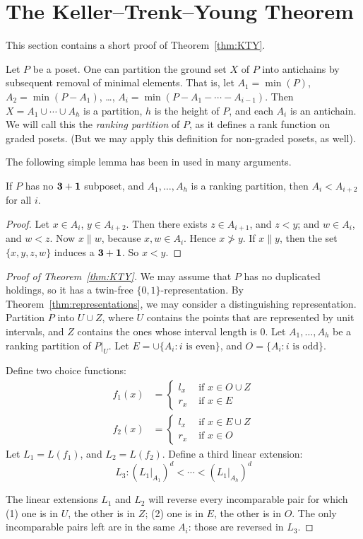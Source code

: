 \section{The Keller--Trenk--Young Theorem}

This section contains a short proof of Theorem~\ref{thm:KTY}.

Let $P$ be a poset. One can partition the ground set $X$ of $P$ into antichains by subsequent removal of minimal elements. That is, let $A_1=\min(P)$, $A_2=\min(P-A_1)$, \dots, $A_i=\min(P-A_1-\cdots-A_{i-1})$. Then $X=A_1\cup\cdots\cup A_h$ is a partition, $h$ is the height of $P$, and each $A_i$ is an antichain. We will call this the \emph{ranking partition} of $P$, as it defines a rank function on graded posets. (But we may apply this definition for non-graded posets, as well).

The following simple lemma has been in used in many arguments.

\begin{lemma}\label{lem:ranking}
If $P$ has no $\mathbf{3}+\mathbf{1}$ subposet, and $A_1,\ldots,A_h$ is a ranking partition, then $A_i<A_{i+2}$ for all $i$.
\end{lemma}

\begin{proof}
Let $x\in A_i$, $y\in A_{i+2}$. Then there exists $z\in A_{i+1}$, and $z<y$; and $w\in A_i$, and $w<z$. Now $x\| w$, because $x,w\in A_i$. Hence $x\not> y$. If $x\|y$, then the set $\{x,y,z,w\}$ induces a $\mathbf{3}+\mathbf{1}$. So $x<y$.
\end{proof}

\begin{proof}[Proof of Theorem~\ref{thm:KTY}]
We may assume that $P$ has no duplicated holdings, so it has a twin-free $\{0,1\}$-representation. By Theorem~\ref{thm:representations}, we may consider a distinguishing representation. Partition $P$ into $U\cup Z$, where $U$ contains the points that are represented by unit intervals, and $Z$ contains the ones whose interval length is $0$. Let $A_1,\ldots,A_h$ be a ranking partition of $P|_U$. Let $E=\cup\{A_i:\text{$i$ is even}\}$, and $O=\{A_i:\text{$i$ is odd}\}$.

Define two choice functions:
\begin{align*}
f_1(x)&=
\begin{cases}
l_x&\text{ if $x\in O\cup Z$}\\
r_x&\text{ if $x\in E$}
\end{cases}\\
f_2(x)&=
\begin{cases}
l_x&\text{ if $x\in E\cup Z$}\\
r_x&\text{ if $x\in O$}
\end{cases}
\end{align*}
Let $L_1=L(f_1)$, and $L_2=L(f_2)$. Define a third linear extension:
\[
L_3:(L_1|_{A_1})^d<\cdots<(L_1|_{A_h})^d
\]

The linear extensions $L_1$ and $L_2$ will reverse every incomparable pair for which (1) one is in $U$, the other is in $Z$; (2) one is in $E$, the other is in $O$. The only incomparable pairs left are in the same $A_i$: those are reversed in $L_3$.
\end{proof}
